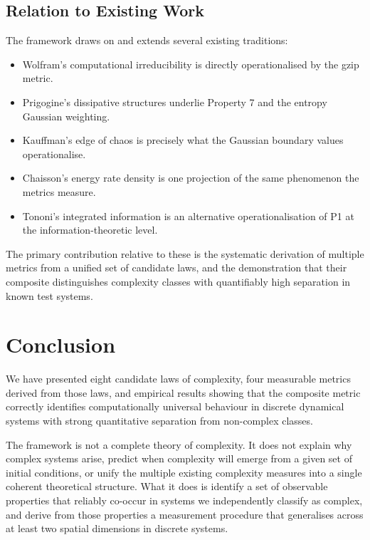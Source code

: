 \documentclass[12pt,a4paper]{article}
\begin{document}
\subsection{Relation to Existing Work}

The framework draws on and extends several existing traditions:

\begin{itemize}[noitemsep]
  \item Wolfram's computational irreducibility \citep{wolfram2002} is
    directly operationalised by the gzip metric.
  \item Prigogine's dissipative structures \citep{prigogine1977} underlie
    Property 7 and the entropy Gaussian weighting.
  \item Kauffman's edge of chaos \citep{kauffman1993} is precisely what
    the Gaussian boundary values operationalise.
  \item Chaisson's energy rate density \citep{chaisson2001} is one
    projection of the same phenomenon the metrics measure.
  \item Tononi's integrated information \citep{tononi2004} is an
    alternative operationalisation of P1 at the information-theoretic level.
\end{itemize}

The primary contribution relative to these is the systematic derivation
of multiple metrics from a unified set of candidate laws, and the
demonstration that their composite distinguishes complexity classes
with quantifiably high separation in known test systems.

\section{Conclusion}

We have presented eight candidate laws of complexity, four measurable
metrics derived from those laws, and empirical results showing that
the composite metric correctly identifies computationally universal
behaviour in discrete dynamical systems with strong quantitative
separation from non-complex classes.

The framework is not a complete theory of complexity.
It does not explain why complex systems arise, predict when complexity
will emerge from a given set of initial conditions, or unify the
multiple existing complexity measures into a single coherent theoretical
structure.
What it does is identify a set of observable properties that reliably
co-occur in systems we independently classify as complex, and derive
from those properties a measurement procedure that generalises across
at least two spatial dimensions in discrete systems.
\end{document}
